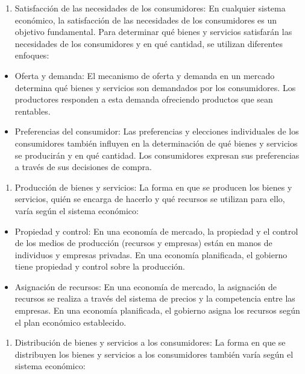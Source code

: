 \documentclass[
  man,
  floatsintext,
  longtable,
  a4paper,
  nolmodern,
  notxfonts,
  notimes,
  12pt,
  colorlinks=true,linkcolor=blue,citecolor=blue,urlcolor=blue]{apa7}
\providecommand{\tightlist}{%
  \setlength{\itemsep}{0pt}\setlength{\parskip}{0pt}}
\begin{document}
\begin{enumerate}
\def\labelenumi{\arabic{enumi}.}
\setcounter{enumi}{1}
\tightlist
\item
  Satisfacción de las necesidades de los consumidores: En cualquier
  sistema económico, la satisfacción de las necesidades de los
  consumidores es un objetivo fundamental. Para determinar qué bienes y
  servicios satisfarán las necesidades de los consumidores y en qué
  cantidad, se utilizan diferentes enfoques:
\end{enumerate}

\begin{itemize}
\item
  Oferta y demanda: El mecanismo de oferta y demanda en un mercado
  determina qué bienes y servicios son demandados por los consumidores.
  Los productores responden a esta demanda ofreciendo productos que sean
  rentables.
\item
  Preferencias del consumidor: Las preferencias y elecciones
  individuales de los consumidores también influyen en la determinación
  de qué bienes y servicios se producirán y en qué cantidad. Los
  consumidores expresan sus preferencias a través de sus decisiones de
  compra.
\end{itemize}

\begin{enumerate}
\def\labelenumi{\arabic{enumi}.}
\setcounter{enumi}{2}
\tightlist
\item
  Producción de bienes y servicios: La forma en que se producen los
  bienes y servicios, quién se encarga de hacerlo y qué recursos se
  utilizan para ello, varía según el sistema económico:
\end{enumerate}

\begin{itemize}
\item
  Propiedad y control: En una economía de mercado, la propiedad y el
  control de los medios de producción (recursos y empresas) están en
  manos de individuos y empresas privadas. En una economía planificada,
  el gobierno tiene propiedad y control sobre la producción.
\item
  Asignación de recursos: En una economía de mercado, la asignación de
  recursos se realiza a través del sistema de precios y la competencia
  entre las empresas. En una economía planificada, el gobierno asigna
  los recursos según el plan económico establecido.
\end{itemize}

\begin{enumerate}
\def\labelenumi{\arabic{enumi}.}
\setcounter{enumi}{3}
\tightlist
\item
  Distribución de bienes y servicios a los consumidores: La forma en que
  se distribuyen los bienes y servicios a los consumidores también varía
  según el sistema económico:
\end{enumerate}
\end{document}
